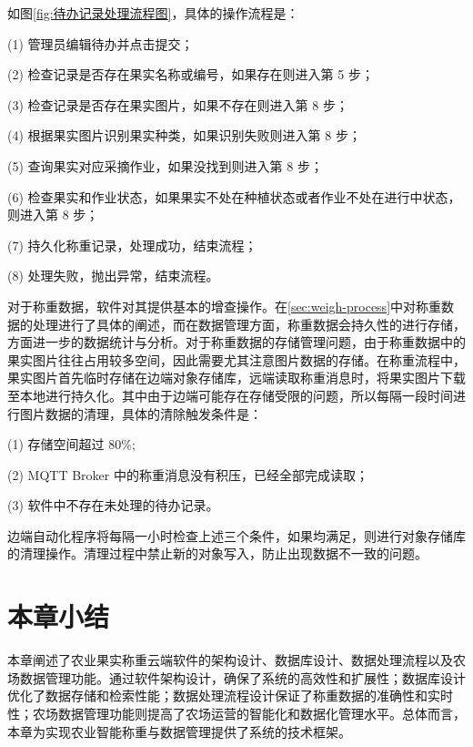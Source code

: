 如图\ref{fig:待办记录处理流程图}，具体的操作流程是：

(1) 管理员编辑待办并点击提交；

(2) 检查记录是否存在果实名称或编号，如果存在则进入第 5 步；

(3) 检查记录是否存在果实图片，如果不存在则进入第 8 步；

(4) 根据果实图片识别果实种类，如果识别失败则进入第 8 步；

(5) 查询果实对应采摘作业，如果没找到则进入第 8 步；

(6) 检查果实和作业状态，如果果实不处在种植状态或者作业不处在进行中状态，则进入第 8 步；

(7) 持久化称重记录，处理成功，结束流程；

(8) 处理失败，抛出异常，结束流程。

对于称重数据，软件对其提供基本的增查操作。在\ref{sec:weigh-process}中对称重数据的处理进行了具体的阐述，而在数据管理方面，称重数据会持久性的进行存储，方面进一步的数据统计与分析。对于称重数据的存储管理问题，由于称重数据中的果实图片往往占用较多空间，因此需要尤其注意图片数据的存储。在称重流程中，果实图片首先临时存储在边端对象存储库，远端读取称重消息时，将果实图片下载至本地进行持久化。其中由于边端可能存在存储受限的问题，所以每隔一段时间进行图片数据的清理，具体的清除触发条件是：

(1) 存储空间超过 80\%;

(2) MQTT Broker 中的称重消息没有积压，已经全部完成读取；

(3) 软件中不存在未处理的待办记录。

边端自动化程序将每隔一小时检查上述三个条件，如果均满足，则进行对象存储库的清理操作。清理过程中禁止新的对象写入，防止出现数据不一致的问题。

\section{本章小结}

本章阐述了农业果实称重云端软件的架构设计、数据库设计、数据处理流程以及农场数据管理功能。通过软件架构设计，确保了系统的高效性和扩展性；数据库设计优化了数据存储和检索性能；数据处理流程设计保证了称重数据的准确性和实时性；农场数据管理功能则提高了农场运营的智能化和数据化管理水平。总体而言，本章为实现农业智能称重与数据管理提供了系统的技术框架。








